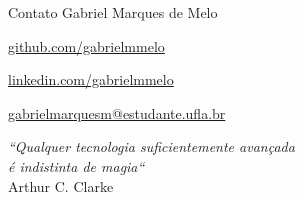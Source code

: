 \documentclass{beamer}
\begin{document}
\begin{frame}{Contato}
{\centering Gabriel Marques de Melo \hspace{190pt}{\Large \color{black} \faLinux}}
    \vspace{15pt}
	\item {\huge \faGithub} \url{github.com/gabrielmmelo}
	\vspace{15pt}
	\item {\huge \faLinkedin} \url{linkedin.com/gabrielmmelo} 
	\vspace{15pt}
	\item {\huge \faEnvelopeO} \url{gabrielmarquesm@estudante.ufla.br} 
\vspace{15pt}
\begin{center}
    \small
    \textit{``Qualquer tecnologia suficientemente avançada \\
    é indistinta de magia``} \\
    \vspace{5pt}
    \footnotesize Arthur C. Clarke 
\end{center}	
	
\end{frame}
\end{document}
